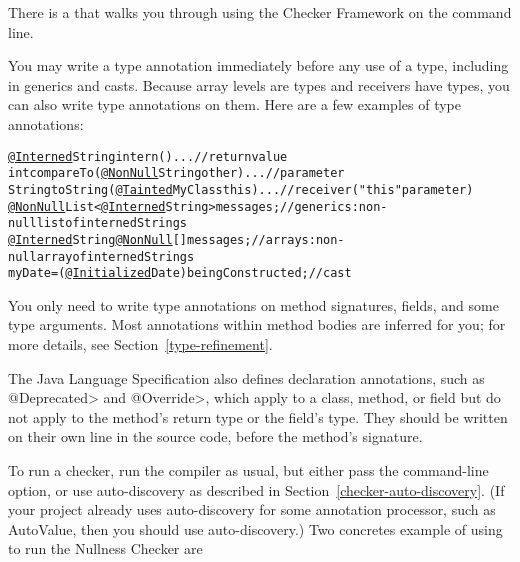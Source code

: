 There is a
that walks you through using the Checker Framework on the
command line.




You may write a type annotation immediately before any
use of a type, including in generics and casts.  Because array levels are
types and receivers have types, you can also write type annotations on
them.  Here are a few examples of type annotations:

\begin{smaller}
\begin{alltt}
  \underline{@Interned} String intern() \ttlcb{} ... \ttrcb{}               // return value
  int compareTo(\underline{@NonNull} String other) \ttlcb{} ... \ttrcb{}    // parameter
  String toString(\underline{@Tainted} MyClass this) \ttlcb{} ... \ttrcb{}  // receiver ("this" parameter)
  \underline{@NonNull} List<\underline{@Interned} String> messages;       // generics:  non-null list of interned Strings
  \underline{@Interned} String \underline{@NonNull} [] messages;          // arrays:  non-null array of interned Strings
  myDate = (\underline{@Initialized} Date) beingConstructed;  // cast
\end{alltt}
\end{smaller}

You only need to write type annotations on method signatures, fields, and some type arguments.
Most annotations within method bodies are inferred for you; for more details,
see  Section~\ref{type-refinement}.

The Java Language Specification also defines
declaration annotations, such as \<@Deprecated> and \<@Override>, which apply
to a class, method, or field but do not apply to the method's return type
or the field's type.  They should be written on their own line in the
source code, before the method's signature.



To run a checker, run the compiler  as usual,
but either pass the  command-line
option, or use auto-discovery as described in
Section~\ref{checker-auto-discovery}.
(If your project already uses auto-discovery for some annotation processor,
such as AutoValue, then you should use auto-discovery.)
Two concretes example of using  to run the Nullness Checker are

